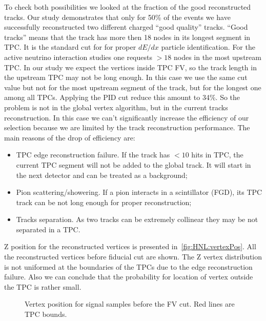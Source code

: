 \documentclass[../main.tex]{subfiles}
\begin{document}
To check both possibilities we looked at the fraction of the good reconstructed tracks. Our study demonstrates that only for 50\% of the events we have successfully reconstructed two different charged ``good quality'' tracks. ``Good tracks'' means that the track has more then 18 nodes in its longest segment in TPC. It is the standard cut for for proper $dE/dx$ particle identification. For the active neutrino interaction studies one requests $>18$ nodes in the most upstream TPC. In our study we expect the vertices inside TPC FV, so the track length in the upstream TPC may not be long enough. In this case we use the same cut value but not for the most upstream segment of the track, but for the longest one among all TPCs. Applying the PID cut reduce this amount to 34\%. So the problem is not in the global vertex algorithm, but in the current tracks reconstruction. In this case we can't significantly increase the efficiency of our selection because we are limited by the track reconstruction performance. The main reasons of the drop of efficiency are:
\begin{itemize}
  \item TPC edge reconstruction failure. If the track has $<10$ hits in TPC, the current TPC segment will not be added to the global track. It will start in the next detector and can be treated as a background;
  \item Pion scattering/showering. If a pion interacts in a scintillator (FGD), its TPC track can be not long enough for proper reconstruction;
  \item Tracks separation. As two tracks can be extremely collinear they may be not separated in a TPC.
\end{itemize}

Z position for the reconstructed vertices is presented in~\autoref{fig:HNL:vertexPos}. All the reconstructed vertices before fiducial cut are shown. The Z vertex distribution is not uniformed at the boundaries of the TPCs due to the edge reconstruction failure. Also we can conclude that the probability for location of vertex outside the TPC is rather small.
\begin{figure}[!ht]
  \caption{Vertex position for signal samples before the FV cut. Red lines are TPC bounds.}
  \label{fig:HNL:vertexPos}
\end{figure}
\end{document}

